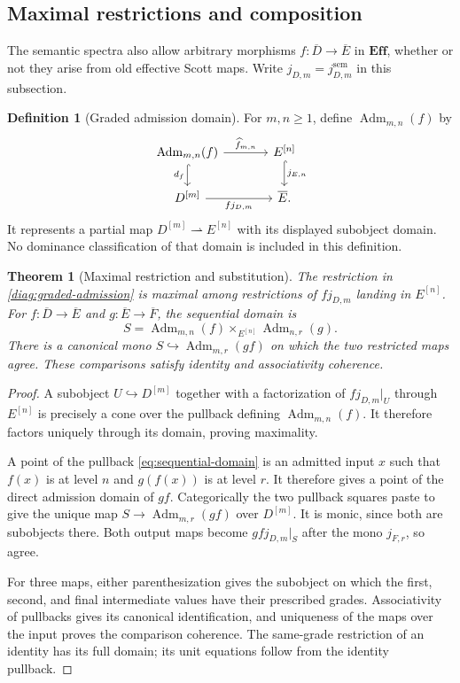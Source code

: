 \documentclass[11pt,a4paper]{article}
\numberwithin{equation}{section}
\newtheorem{theorem}{Theorem}[section]
\theoremstyle{definition}
\newtheorem{definition}[definition]{Definition}
\theoremstyle{remark}
\theoremstyle{plain}
\newcommand{\E}{\mathbf{Eff}}
\newcommand{\Adm}{\operatorname{Adm}}
\newcommand{\incl}{\hookrightarrow}
\newcommand{\pmap}{\rightharpoonup}
\newcommand{\jsem}{j^{\mathrm{sem}}}
\begin{document}
\subsection{Maximal restrictions and composition}

The semantic spectra also allow arbitrary morphisms
$f:\overline D\to\overline E$ in $\E$, whether or not they arise
from old effective Scott maps. Write $j_{D,m}=\jsem_{D,m}$ in this
subsection.

\begin{definition}[Graded admission domain]
\label{def:graded-admission}
For $m,n\geq1$, define $\Adm_{m,n}(f)$ by
\begin{equation}\label{diag:graded-admission}
\begin{tikzcd}[column sep=large]
 \Adm_{m,n}(f)\ar[r,"\widehat f_{m,n}"]\ar[d,hook,"d_f"']&
 E^{[n]}\ar[d,hook,"j_{E,n}"]\\
 D^{[m]}\ar[r,"f j_{D,m}"']&\overline E.
\end{tikzcd}
\end{equation}
It represents a partial map $D^{[m]}\pmap E^{[n]}$ with its displayed
subobject domain. No dominance classification of that domain is
included in this definition.
\end{definition}

\begin{theorem}[Maximal restriction and substitution]
\label{thm:admissible-substitution}
The restriction in \eqref{diag:graded-admission} is maximal among
restrictions of $f j_{D,m}$ landing in $E^{[n]}$. For
$f:\overline D\to\overline E$ and
$g:\overline E\to\overline F$, the sequential domain is
\begin{equation}\label{eq:sequential-domain}
 S=\Adm_{m,n}(f)\times_{E^{[n]}}\Adm_{n,r}(g).
\end{equation}
There is a canonical mono
$S\incl\Adm_{m,r}(gf)$ on which the two restricted maps agree.
These comparisons satisfy identity and associativity coherence.
\end{theorem}
\begin{proof}
A subobject $U\incl D^{[m]}$ together with a factorization of
$f j_{D,m}|_U$ through $E^{[n]}$ is precisely a cone over the
pullback defining $\Adm_{m,n}(f)$. It therefore factors uniquely
through its domain, proving maximality.

A point of the pullback \eqref{eq:sequential-domain} is an admitted
input $x$ such that $f(x)$ is at level $n$ and $g(f(x))$ is at level
$r$. It therefore gives a point of the direct admission domain of
$gf$. Categorically the two pullback squares paste to give the unique
map $S\to\Adm_{m,r}(gf)$ over $D^{[m]}$. It is monic, since both
are subobjects there. Both output maps become $gf j_{D,m}|_S$ after
the mono $j_{F,r}$, so agree.

For three maps, either parenthesization gives the subobject on which
the first, second, and final intermediate values have their prescribed
grades. Associativity of pullbacks gives its canonical identification,
and uniqueness of the maps over the input proves the comparison
coherence. The same-grade restriction of an identity has its full
domain; its unit equations follow from the identity pullback.
\end{proof}
\end{document}
